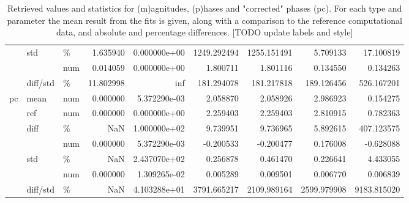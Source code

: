 \begin{table}
\begin{tabular}{lllrrrrrr}
   & std & \% &           1.635940 &       0.000000e+00 &        1249.292494 &        1255.151491 &          5.709133 &         17.100819 \\
   &          & num &           0.014059 &       0.000000e+00 &           1.800711 &           1.801116 &          0.134550 &          0.134263 \\
   & diff/std & \% &          11.802998 &                inf &         181.294078 &         181.217818 &        189.126456 &        526.167201 \\
pc & mean & num &           0.000000 &       5.372290e-03 &           2.058870 &           2.058926 &          2.986923 &          0.154275 \\
   & ref & num &           0.000000 &       0.000000e+00 &           2.259403 &           2.259403 &          2.810915 &          0.782363 \\
   & diff & \% &                NaN &       1.000000e+02 &           9.739951 &           9.736965 &          5.892615 &        407.123575 \\
   &          & num &           0.000000 &       5.372290e-03 &          -0.200533 &          -0.200477 &          0.176008 &         -0.628088 \\
   & std & \% &                NaN &       2.437070e+02 &           0.256878 &           0.461470 &          0.226641 &          4.433055 \\
   &          & num &           0.000000 &       1.309265e-02 &           0.005289 &           0.009501 &          0.006770 &          0.006839 \\
   & diff/std & \% &                NaN &       4.103288e+01 &        3791.665217 &        2109.989164 &       2599.979908 &       9183.815020 \\
\bottomrule
\end{tabular}

\caption{\label{tab:matE}Retrieved values and statistics for (m)agnitudes, (p)hases and "corrected" phases (pc). For each type and parameter the mean result from the fits is given, along with a comparison to the reference computational data, and absolute and percentage differences. [TODO update labels and style]}
\end{table}